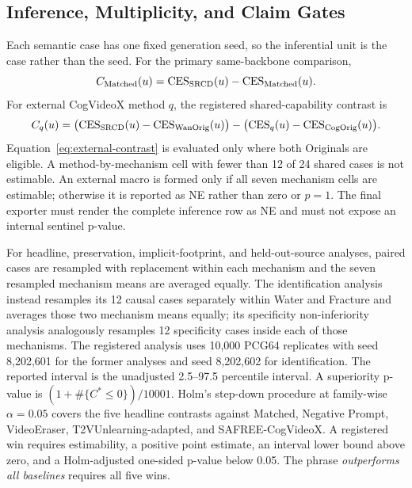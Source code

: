 \subsection{Inference, Multiplicity, and Claim Gates}
\label{app:statistical-protocol}

Each semantic case has one fixed generation seed, so the inferential unit is
the case rather than the seed.  For the primary same-backbone comparison,
\begin{equation}
  C_{\mathrm{Matched}}(u)
  =
  \mathrm{CES}_{\mathrm{SRCD}}(u)-\mathrm{CES}_{\mathrm{Matched}}(u).
  \label{eq:matched-contrast}
\end{equation}
For external CogVideoX method \(q\), the registered shared-capability contrast
is
\begin{equation}
  C_q(u)
  =
  \bigl(\mathrm{CES}_{\mathrm{SRCD}}(u)-\mathrm{CES}_{\mathrm{WanOrig}}(u)\bigr)
  -
  \bigl(\mathrm{CES}_q(u)-\mathrm{CES}_{\mathrm{CogOrig}}(u)\bigr).
  \label{eq:external-contrast}
\end{equation}
Equation~\ref{eq:external-contrast} is evaluated only where both Originals are
eligible.  A method-by-mechanism cell with fewer than 12 of 24 shared cases is
not estimable.  An external macro is formed only if all seven mechanism cells
are estimable; otherwise it is reported as NE rather than zero or
\(p=1\).  The final exporter must render the complete inference row as NE and
must not expose an internal sentinel p-value.

For headline, preservation, implicit-footprint, and held-out-source analyses,
paired cases are resampled with replacement within each mechanism and the
seven resampled mechanism means are averaged equally.  The identification
analysis instead resamples its 12 causal cases separately within Water and
Fracture and averages those two mechanism means equally; its specificity
non-inferiority analysis analogously resamples 12 specificity cases inside
each of those mechanisms.  The registered
analysis uses 10,000 PCG64 replicates with seed 8,202,601 for the former
analyses and seed 8,202,602 for identification.  The reported interval is the
unadjusted 2.5--97.5 percentile interval.  A superiority p-value is
\((1+\#\{C^\ast\leq0\})/10001\).  Holm's step-down procedure at family-wise
\(\alpha=0.05\) covers the five headline contrasts against Matched, Negative
Prompt, VideoEraser, T2VUnlearning-adapted, and SAFREE-CogVideoX.  A registered win
requires estimability, a positive point estimate, an interval lower bound
above zero, and a Holm-adjusted one-sided p-value below 0.05.  The phrase
\emph{outperforms all baselines} requires all five wins.

